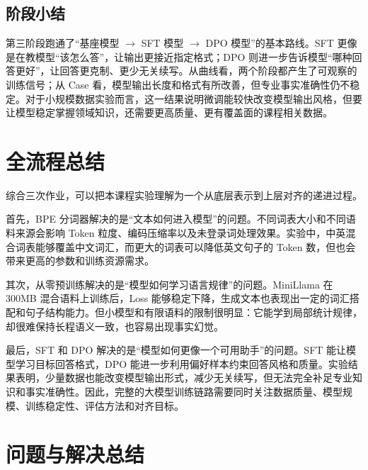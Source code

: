\documentclass[a4paper,12pt]{ctexart}
\begin{document}
\subsection{阶段小结}

第三阶段跑通了“基座模型 $\rightarrow$ SFT 模型 $\rightarrow$ DPO 模型”的基本路线。SFT 更像是在教模型“该怎么答”，让输出更接近指定格式；DPO 则进一步告诉模型“哪种回答更好”，让回答更克制、更少无关续写。从曲线看，两个阶段都产生了可观察的训练信号；从 Case 看，模型输出长度和格式有所改善，但专业事实准确性仍不稳定。对于小规模数据实验而言，这一结果说明微调能较快改变模型输出风格，但要让模型稳定掌握领域知识，还需要更高质量、更有覆盖面的课程相关数据。

\section{全流程总结}

综合三次作业，可以把本课程实验理解为一个从底层表示到上层对齐的递进过程。

首先，BPE 分词器解决的是“文本如何进入模型”的问题。不同词表大小和不同语料来源会影响 Token 粒度、编码压缩率以及未登录词处理效果。实验中，中英混合词表能够覆盖中文词汇，而更大的词表可以降低英文句子的 Token 数，但也会带来更高的参数和训练资源需求。

其次，从零预训练解决的是“模型如何学习语言规律”的问题。MiniLlama 在 300MB 混合语料上训练后，Loss 能够稳定下降，生成文本也表现出一定的词汇搭配和句子结构能力。但小模型和有限语料的限制很明显：它能学到局部统计规律，却很难保持长程语义一致，也容易出现事实幻觉。

最后，SFT 和 DPO 解决的是“模型如何更像一个可用助手”的问题。SFT 能让模型学习目标回答格式，DPO 能进一步利用偏好样本约束回答风格和质量。实验结果表明，少量数据也能改变模型输出形式，减少无关续写，但无法完全补足专业知识和事实准确性。因此，完整的大模型训练链路需要同时关注数据质量、模型规模、训练稳定性、评估方法和对齐目标。

\section{问题与解决总结}

%
\end{document}
